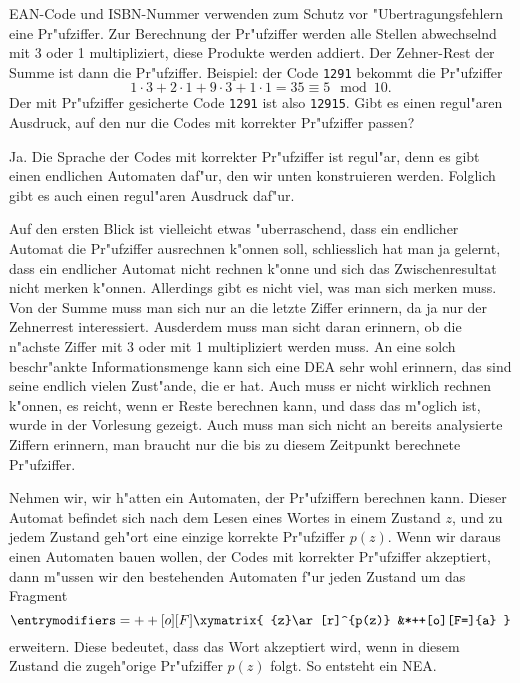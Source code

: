 EAN-Code und ISBN-Nummer verwenden zum Schutz vor "Ubertragungsfehlern
eine Pr"ufziffer. Zur Berechnung der Pr"ufziffer werden alle
Stellen abwechselnd mit 3 oder 1 multipliziert, diese Produkte werden
addiert. Der Zehner-Rest der Summe ist dann die Pr"ufziffer.
Beispiel: der Code {\tt 1291} bekommt die Pr"ufziffer
\[
1\cdot 3+2\cdot1+9\cdot3+1\cdot 1=35\equiv 5\mod10.
\]
Der mit Pr"ufziffer gesicherte Code {\tt 1291} ist also {\tt 12915}.
Gibt es einen regul"aren Ausdruck, auf den nur die Codes mit korrekter
Pr"ufziffer passen?

\begin{loesung}
Ja. Die Sprache der Codes mit korrekter Pr"ufziffer ist regul"ar,
denn es gibt einen endlichen Automaten daf"ur, den wir unten konstruieren
werden. Folglich gibt es auch einen regul"aren Ausdruck daf"ur.

Auf den ersten Blick ist vielleicht etwas "uberraschend, dass
ein endlicher Automat die Pr"ufziffer ausrechnen k"onnen soll,
schliesslich hat man ja gelernt, dass ein endlicher Automat
nicht rechnen k"onne und sich das Zwischenresultat nicht merken
k"onnen. Allerdings gibt es nicht viel, was man sich merken
muss. Von der Summe muss man sich nur an die letzte Ziffer
erinnern, da ja nur der Zehnerrest interessiert. Ausderdem
muss man sicht daran erinnern, ob die n"achste Ziffer mit
3 oder mit 1 multipliziert werden muss. An eine solch beschr"ankte
Informationsmenge kann sich eine DEA sehr wohl erinnern, das sind
seine endlich vielen Zust"ande, die er hat. Auch muss er nicht
wirklich rechnen k"onnen, es reicht, wenn er Reste berechnen
kann, und dass das m"oglich ist, wurde in der Vorlesung gezeigt.
Auch muss man sich nicht an bereits analysierte Ziffern erinnern,
man braucht nur die bis zu diesem Zeitpunkt berechnete Pr"ufziffer.

Nehmen wir, wir h"atten ein Automaten, der Pr"ufziffern
berechnen kann. Dieser Automat befindet sich nach dem Lesen eines
Wortes in einem Zustand $z$, und zu jedem Zustand geh"ort eine
einzige korrekte Pr"ufziffer $p(z)$. Wenn wir daraus einen
Automaten bauen wollen, der Codes mit korrekter Pr"ufziffer
akzeptiert, dann m"ussen wir den bestehenden Automaten f"ur
jeden Zustand um das Fragment
\[
\entrymodifiers={++[o][F]}
\xymatrix{
{z}\ar[r]^{p(z)}
        &*++[o][F=]{a}
}
\]
erweitern.
Diese bedeutet, dass das Wort akzeptiert wird, wenn in diesem
Zustand die zugeh"orige Pr"ufziffer $p(z)$ folgt. So entsteht
ein NEA.


\end{loesung}
